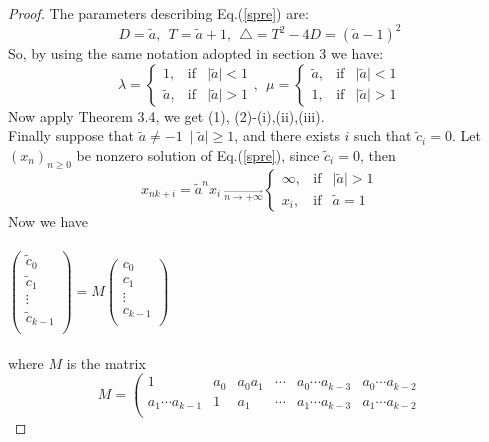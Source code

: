 \documentclass[11pt]{amsart}
\theoremstyle{definition}
\theoremstyle{remark}
\theoremstyle{example}
\numberwithin{equation}{section}
\begin{document}
\begin{proof}\rm{
The parameters describing Eq.(\ref{spre}) are: $$D=\tilde{a}, \ \ T=\tilde{a}+1, \ \  \triangle=T^2-4D=(\tilde{a}-1)^2$$
So, by using the same notation adopted in section 3 we have:
$$\lambda=\left\{\begin{array}{ccc}
   1, &\text{if} & \mid\tilde{a}\mid<1 \\
    \tilde{a}, & \text{if} & \mid\tilde{a}\mid>1
  \end{array}\right., \ \
 \mu=\left\{\begin{array}{ccc}
   \tilde{a}, & \text{if} & \mid\tilde{a}\mid<1 \\
   1, & \text{if} & \mid\tilde{a}\mid>1
  \end{array}\right.$$
  Now apply Theorem 3.4, we get (1), (2)-(i),(ii),(iii).\\
  Finally suppose that $\tilde{a}\neq-1 \ \mid\tilde{a}\mid\geq1$, and there exists $i$ such that $\tilde{c}_i=0$.
  Let $(x_n)_{n\geq0}$ be nonzero solution of Eq.(\ref{spre}), since $\tilde{c}_i=0$, then $$x_{nk+i}=\tilde{a}^nx_i\ _ { \overrightarrow{n\rightarrow+\infty}}
  \left\{\begin{array}{ccc}
     \infty, & \text{if} & \mid\tilde{a}\mid>1 \\
      x_i, & \text{if} & \tilde{a}=1
    \end{array}\right.
  $$
 Now we have \\
 \\
  $\left(\begin{array}{c}
            \tilde{c}_0 \\
            \tilde{c}_1 \\
            \vdots \\
          \tilde{c}_{k-1} \\
\end{array}\right)
=M\left(\begin{array}{c}
            c_0 \\
            c_1 \\
            \vdots \\
          c_{k-1} \\
\end{array}\right)$\\
\\
where $M$ is the matrix
$$M=\left(
      \begin{array}{cccccc}
        1 & a_0 & a_0a_1 &\cdots & a_0\cdots a_{k-3} & a_0\cdots a_{k-2} \\
        a_1\cdots a_{k-1} & 1 & a_1 & \cdots & a_1\cdots a_{k-3}& a_1\cdots a_{k-2}\\

\end{array}$$}
\end{proof}
\end{document}
